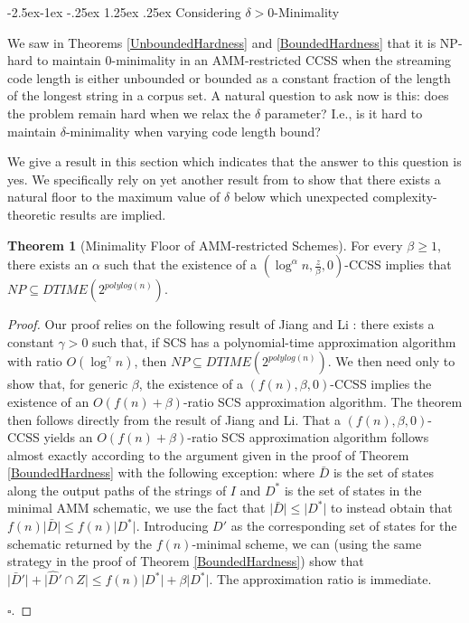 \documentclass{article}
\makeatletter
\renewcommand\paragraph{\@startsection{paragraph}{4}{\z@}%
            {-2.5ex\@plus -1ex \@minus -.25ex}%
            {1.25ex \@plus .25ex}%
            {\normalfont\normalsize\bfseries}}
\theoremstyle{definition}
\newtheorem{theorem}{Theorem}[section]
\makeatother
\begin{document}
\paragraph{Considering $\delta > 0$-Minimality}

We saw in Theorems \ref{UnboundedHardness} and \ref{BoundedHardness} that it 
is NP-hard to maintain 0-minimality in an AMM-restricted CCSS when the streaming 
code length is either unbounded or bounded as a constant fraction of the length 
of the longest string in a corpus set.  A natural question to ask now is this:
does the problem remain hard when we relax the $\delta$ parameter?  I.e.,
is it hard to maintain $\delta$-minimality when varying code length bound?

We give a result in this section which indicates that the answer to this question 
is yes.  We specifically rely on yet another result from 
\cite{SCSResults} to show that there exists a natural floor to the maximum value 
of $\delta$ below which unexpected complexity-theoretic results are implied.

\begin{theorem}[Minimality Floor of AMM-restricted Schemes]
\label{MinimalityRoof}
For every $\beta \geq 1$, there exists an $\alpha$ such that the existence of a 
$(\log^\alpha{n}, \frac{z}{\beta},0)$-CCSS implies that 
$NP \subseteq DTIME(2^{polylog(n)})$.
\end{theorem}

\begin{proof}
Our proof relies on the following result of Jiang and Li \cite{SCSResults}:
there exists a constant $\gamma > 0$ such that, if SCS has a polynomial-time 
approximation algorithm with ratio $O(\log^\gamma{n})$, then 
$NP \subseteq DTIME(2^{polylog(n)})$.  We then need only to show that, for 
generic $\beta$, the existence of a $(f(n), \beta, 0)$-CCSS implies the 
existence of an $O(f(n)+\beta)$-ratio SCS approximation algorithm.  The 
theorem then follows directly from the result of Jiang and Li.
\newline\newline
That a $(f(n), \beta, 0)$-CCSS yields an $O(f(n)+\beta)$-ratio SCS approximation 
algorithm follows almost exactly according to the argument given in the proof 
of Theorem \ref{BoundedHardness} with the following exception: where $\bar{D}$ 
is the set of states along the output paths of the strings of $I$ and 
$D^*$ is the set of states in the minimal AMM schematic, we use the 
fact that $\lvert \bar{D} \rvert \leq \lvert D^* \rvert$ to instead obtain 
that $f(n) \lvert \bar{D} \rvert \leq f(n) \lvert D^* \rvert$.  Introducing 
$D'$ as the corresponding set of states for the schematic returned by the 
$f(n)$-minimal scheme, we can (using the same strategy in the proof of 
Theorem \ref{BoundedHardness}) show that 
$\lvert \bar{D}' \rvert + \lvert \hat{D}' \cap Z \rvert 
\leq f(n) \lvert D^* \rvert + \beta \lvert D^* \rvert$.  The approximation ratio 
is immediate.

$\square$.
\end{proof}
\end{document}
